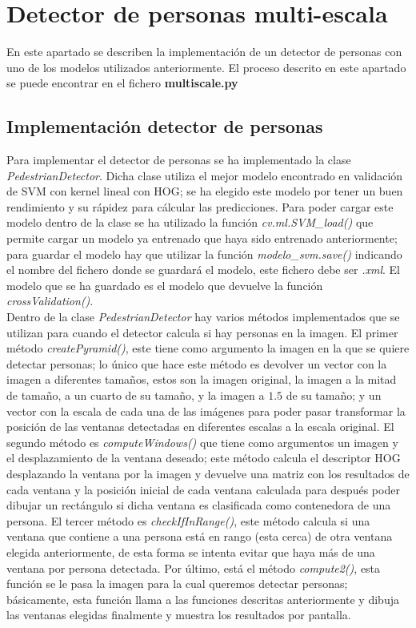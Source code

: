 \chapter{Detector de personas multi-escala}
En este apartado se describen la implementación de un detector de personas con uno de los modelos utilizados anteriormente. El proceso descrito en este apartado se puede encontrar en el fichero \textbf{multiscale.py}

\section{Implementación detector de personas}
Para implementar el detector de personas se ha implementado la clase \textit{PedestrianDetector}. Dicha clase utiliza el mejor modelo encontrado en validación de SVM con kernel lineal con HOG; se ha elegido este modelo por tener un buen rendimiento y su rápidez para cálcular las predicciones. Para poder cargar este modelo dentro de la clase se ha utilizado la función \textit{cv.ml.SVM\_load()} que permite cargar un modelo ya entrenado que haya sido entrenado anteriormente; para guardar el modelo hay que utilizar la función \textit{modelo\_svm.save()} indicando el nombre del fichero donde se guardará el modelo, este fichero debe ser \textit{.xml}. El modelo que se ha guardado es el modelo que devuelve la función \textit{crossValidation()}. \\

Dentro de la clase \textit{PedestrianDetector} hay varios métodos implementados que se utilizan para cuando el detector calcula si hay personas en la imagen. El primer método \textit{createPyramid()}, este tiene como argumento la imagen en la que se quiere detectar personas; lo único que hace este método es devolver un vector con la imagen a diferentes tamaños, estos son la imagen original, la imagen a la mitad de tamaño, a un cuarto de su tamaño, y la imagen a $1.5$ de su tamaño; y un vector con la escala de cada una de las imágenes para poder pasar transformar la posición de las ventanas detectadas en diferentes escalas a la escala original. El segundo método es \textit{computeWindows()} que tiene como argumentos un imagen y el desplazamiento de la ventana deseado; este método calcula el descriptor HOG desplazando la ventana por la imagen y devuelve una matriz con los resultados de cada ventana y la posición inicial de cada ventana calculada para después poder dibujar un rectángulo si dicha ventana es clasificada como contenedora de una persona. El tercer método es \textit{checkIfInRange()}, este método calcula si una ventana que contiene a una persona está en rango (esta cerca) de otra ventana elegida anteriormente, de esta forma se intenta evitar que haya más de una ventana por persona detectada. Por último, está el método \textit{compute2()}, esta función se le pasa la imagen para la cual queremos detectar personas; básicamente, esta función llama a las funciones descritas anteriormente y dibuja las ventanas elegidas finalmente y muestra los resultados por pantalla.

